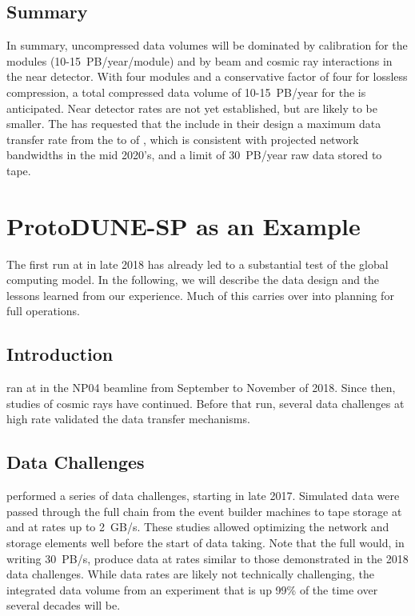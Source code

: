 \subsection{Summary}
In summary, uncompressed data volumes will be dominated by calibration for the  modules (10-15~PB/year/module) and by beam and cosmic ray interactions in the near detector.  With four  modules and a conservative factor of four for lossless compression, a total compressed data volume of 10-15~PB/year for the  is anticipated. Near detector rates are not yet established, but are likely to be smaller.   
The  has requested that the   %
include %
in their design a  maximum data transfer rate from the  to  of \surffnalbw, which is consistent with projected network bandwidths in the mid 2020's, and a limit of \SI{30}{PB/year} raw data stored to tape.  


\section{ProtoDUNE-SP as an Example}
\label{ch:exec-comp-proto-SP}
The first   run at  in late 2018 has already led to a %
substantial test of the global computing model.  In the following, we will describe the  data design and the lessons learned from our experience. Much of this carries over into planning for full  operations. 

\subsection{Introduction}

 ran at  in the NP04 beamline from September to November of 2018. Since then, studies of cosmic rays have continued. Before that run, several data challenges at high rate validated the data transfer mechanisms. 

\subsection{Data Challenges}

 performed a series of data challenges, starting in late 2017.  Simulated data were passed through the full chain from the event builder machines to tape storage at  and  at rates up to \SI{2}{GB/s}.  These studies allowed optimizing the network and storage elements well before the start of data taking.
Note that the full   would, in writing \SI{30}{PB/s}, produce data at rates similar to  those demonstrated in the 2018 data challenges. While data rates are likely not technically challenging, the integrated data volume from an experiment that is up 99\% of the time over several decades will be. 


